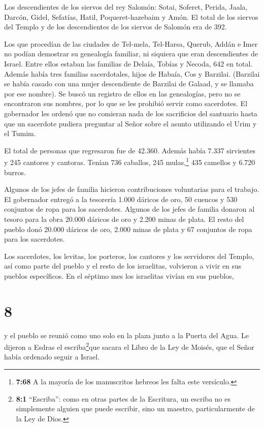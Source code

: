  Los descendientes de los siervos del rey Salomón: Sotai,
Soferet, Perida,  Jaala, Darcón, Gidel, 
Sefatías, Hatil, Poqueret-hazebaim y Amón.  El total de los
siervos del Templo y de los descendientes de los siervos de Salomón era
de 392.

 Los que procedían de las ciudades de Tel-mela, Tel-Harsa,
Querub, Addán e Imer no podían demostrar su genealogía familiar, ni
siquiera que eran descendientes de Israel.  Entre ellos
estaban las familias de Delaía, Tobías y Necoda, 642 en total.
 Además había tres familias sacerdotales, hijos de Habaía,
Cos y Barzilai. (Barzilai se había casado con una mujer descendiente de
Barzilai de Galaad, y se llamaba por ese nombre).  Se buscó
un registro de ellos en las genealogías, pero no se encontraron sus
nombres, por lo que se les prohibió servir como sacerdotes.
 El gobernador les ordenó que no comieran nada de los
sacrificios del santuario hasta que un sacerdote pudiera preguntar al
Señor sobre el asunto utilizando el Urim y el Tumim.

 El total de personas que regresaron fue de 42.360.
 Además había 7.337 sirvientes y 245 cantores y cantoras.
 Tenían 736 caballos, 245 mulas,\footnote{\textbf{7:68} A
  la mayoría de los manuscritos hebreos les falta este versículo.}
 435 camellos y 6.720 burros.

 Algunos de los jefes de familia hicieron contribuciones
voluntarias para el trabajo. El gobernador entregó a la tesorería 1.000
dáricos de oro, 50 cuencos y 530 conjuntos de ropa para los sacerdotes.
 Algunos de los jefes de familia donaron al tesoro para la
obra 20.000 dáricos de oro y 2.200 minas de plata.  El
resto del pueblo donó 20.000 dáricos de oro, 2.000 minas de plata y 67
conjuntos de ropa para los sacerdotes.

 Los sacerdotes, los levitas, los porteros, los cantores y
los servidores del Templo, así como parte del pueblo y el resto de los
israelitas, volvieron a vivir en sus pueblos específicos. En el séptimo
mes los israelitas vivían en sus pueblos,

\hypertarget{section-7}{%
\section{8}\label{section-7}}

 y el pueblo se reunió como uno solo en la plaza junto a la
Puerta del Agua. Le dijeron a Esdras el escriba\footnote{\textbf{8:1}
  ``Escriba'': como en otras partes de la Escritura, un escriba no es
  simplemente alguien que puede escribir, sino un maestro,
  particularmente de la Ley de Dios.}que sacara el Libro de la Ley de
Moisés, que el Señor había ordenado seguir a Israel.

